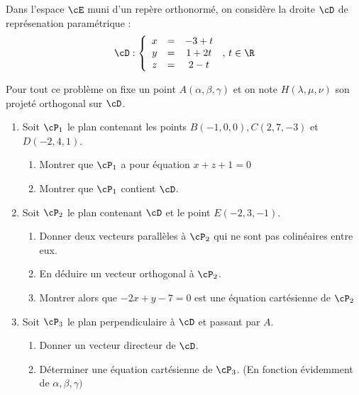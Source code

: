 \documentclass[a4paper, 11pt,reqno]{article}
\begin{document}
\begin{exercice}
Dans l'espace $\cE$ muni d'un repère orthonormé, on considère la droite $\cD$ de représenation paramétrique : 
$$\cD : \left\{ 
\begin{array}{ccc}
x&=& -3+t\\
y&=& 1+2t\\
z&=& 2-t
\end{array}
\right.\,  ,\, t\in \R$$

Pour tout ce problème on fixe un point $A(\alpha, \beta, \gamma) $ et on note $H(\lambda, \mu, \nu) $ son projeté orthogonal sur $\cD$. 

\begin{enumerate}
\item  Soit $\cP_1$ le plan contenant les points $B(-1,0,0), C(2,7,-3)$ et $D(-2,4,1)$.
\begin{enumerate}
\item Montrer que $\cP_1$ a pour équation $x+z+1=0$
\item Montrer que $\cP_1$ contient $\cD$. 
\end{enumerate}
\item Soit $\cP_2$ le plan contenant $\cD$ et le point $E(-2,3,-1)$. 
\begin{enumerate}
\item  Donner deux vecteurs parallèles à $\cP_2$ qui ne sont pas colinéaires entre eux. 
\item En déduire un vecteur orthogonal à $\cP_2$.
\item Montrer alors  que $-2x+y-7=0$ est une équation cartésienne de $\cP_2$
\end{enumerate}
\item Soit  $\cP_3$ le plan perpendiculaire à $\cD$ et passant par   $A$. 
\begin{enumerate} 
\item Donner un vecteur directeur de $\cD$. 
\item Déterminer une équation cartésienne de $\cP_3$.  (En fonction évidemment de $\alpha, \beta, \gamma)$
\end{enumerate}


\end{enumerate}
\end{exercice}
\end{document}

